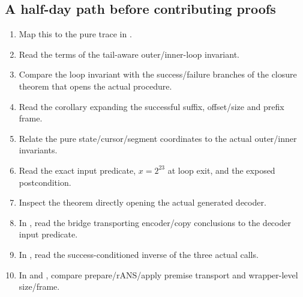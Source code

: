 \subsection{A half-day path before contributing proofs}

\begin{enumerate}
  \item {}\newline
        Map this to the pure trace in .
  \item {}\newline
        Read the terms of the tail-aware outer/inner-loop invariant.
  \item {}\newline
        Compare the loop invariant with the success/failure branches of the
        closure theorem that opens the actual procedure.
  \item {}\newline
        Read the corollary expanding the successful suffix, offset/size and prefix frame.
  \item {}\newline
        Relate the pure state/cursor/segment coordinates to the actual
        outer/inner invariants.
  \item {}\newline
        Read the exact input predicate, \(x=2^{23}\) at loop exit, and the
        exposed postcondition.
  \item {}\newline
        Inspect the theorem directly opening the actual generated decoder.
  \item In , read the bridge
        transporting encoder/copy conclusions to the decoder input predicate.
  \item In , read the success-conditioned
        inverse of the three actual calls.
  \item {}\newline
        In  and
        , compare prepare/rANS/apply
        premise transport and wrapper-level size/frame.

\end{enumerate}
